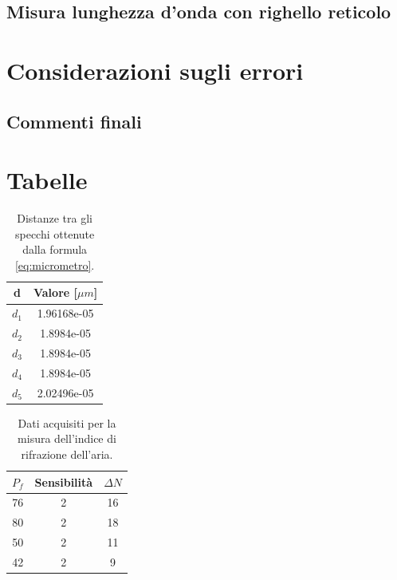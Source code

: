 \documentclass[letterpaper,12pt]{article}
\begin{document}
\subsection{Misura lunghezza d'onda con righello reticolo}





\section{Considerazioni sugli errori}
\label{sec:errori}

\subsection{Commenti finali}



\newpage
\section{Tabelle}


\begin{table}[h!]
    \centering
    \begin{tabular}{|c|c|}
    \hline
    \textbf{d} & \textbf{Valore} [$\mu m$] \\
    \hline
    $d_1$ & 1.96168e-05 \\
    $d_2$ & 1.8984e-05 \\
    $d_3$ & 1.8984e-05 \\
    $d_4$ & 1.8984e-05 \\
    $d_5$ & 2.02496e-05 \\
    \hline
    \end{tabular}
    \caption{Distanze tra gli specchi ottenute dalla formula \ref{eq:micrometro}.}
    \label{tab:calibrazione_micrometro_michelson}
\end{table}

\begin{table}[h!]
    \centering
    \begin{tabular}{|c|c|c|}
    \hline
    \textbf{$P_f$} & \textbf{Sensibilità} & \textbf{$\Delta N$} \\
    \hline
    76 & 2 & 16 \\
    80 & 2 & 18 \\
    50 & 2 & 11 \\
    42 & 2 & 9 \\
    \hline
    \end{tabular}
    \caption{Dati acquisiti per la misura dell'indice di rifrazione dell'aria.}
    \label{tab:indice_rifrazione_aria_dati}
\end{table}
\end{document}
